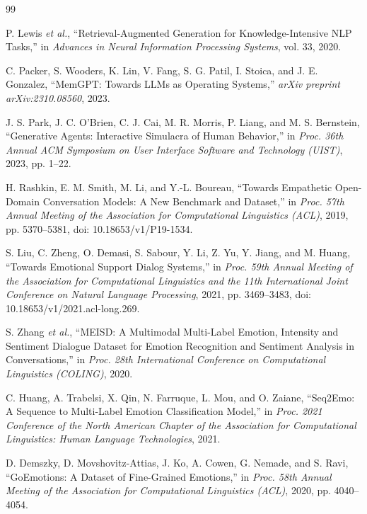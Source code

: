 \documentclass[graybox]{svmult}
\begin{document}

\begin{thebibliography}{99}

P. Lewis \textit{et al.}, ``Retrieval-Augmented Generation for
Knowledge-Intensive NLP Tasks,'' in \textit{Advances in Neural Information
Processing Systems}, vol. 33, 2020.

C. Packer, S. Wooders, K. Lin, V. Fang, S. G. Patil, I. Stoica, and
J. E. Gonzalez, ``MemGPT: Towards LLMs as Operating Systems,''
\textit{arXiv preprint arXiv:2310.08560}, 2023.

J. S. Park, J. C. O'Brien, C. J. Cai, M. R. Morris, P. Liang, and
M. S. Bernstein, ``Generative Agents: Interactive Simulacra of Human
Behavior,'' in \textit{Proc. 36th Annual ACM Symposium on User Interface
Software and Technology (UIST)}, 2023, pp. 1--22.

H. Rashkin, E. M. Smith, M. Li, and Y.-L. Boureau, ``Towards Empathetic
Open-Domain Conversation Models: A New Benchmark and Dataset,'' in
\textit{Proc. 57th Annual Meeting of the Association for Computational
Linguistics (ACL)}, 2019, pp. 5370--5381,
doi: 10.18653/v1/P19-1534.

S. Liu, C. Zheng, O. Demasi, S. Sabour, Y. Li, Z. Yu, Y. Jiang, and
M. Huang, ``Towards Emotional Support Dialog Systems,'' in
\textit{Proc. 59th Annual Meeting of the Association for Computational
Linguistics and the 11th International Joint Conference on Natural
Language Processing}, 2021, pp. 3469--3483,
doi: 10.18653/v1/2021.acl-long.269.

S. Zhang \textit{et al.}, ``MEISD: A Multimodal Multi-Label Emotion,
Intensity and Sentiment Dialogue Dataset for Emotion Recognition and
Sentiment Analysis in Conversations,'' in \textit{Proc. 28th International
Conference on Computational Linguistics (COLING)}, 2020.

C. Huang, A. Trabelsi, X. Qin, N. Farruque, L. Mou, and O. Zaiane,
``Seq2Emo: A Sequence to Multi-Label Emotion Classification Model,'' in
\textit{Proc. 2021 Conference of the North American Chapter of the
Association for Computational Linguistics: Human Language Technologies},
2021.

D. Demszky, D. Movshovitz-Attias, J. Ko, A. Cowen, G. Nemade, and
S. Ravi, ``GoEmotions: A Dataset of Fine-Grained Emotions,'' in
\textit{Proc. 58th Annual Meeting of the Association for Computational
Linguistics (ACL)}, 2020, pp. 4040--4054.


\end{thebibliography}
\end{document}
